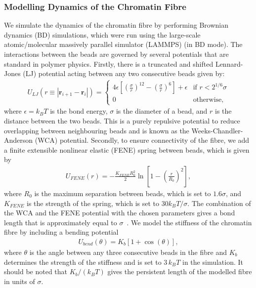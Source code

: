 \documentclass[12pt]{article}
\begin{document}
\subsubsection{Modelling Dynamics of the Chromatin Fibre}
We simulate the dynamics of the chromatin fibre by performing Brownian dynamics (BD) simulations, which were run using the large-scale atomic/molecular massively parallel simulator (LAMMPS) (in BD mode). The interactions between the beads are governed by several potentials that are standard in polymer physics. Firstly, there is a truncated and shifted Lennard-Jones (LJ) potential acting between any two consecutive beads given by:
\begin{eqnarray}
U_{LJ}(r \equiv |\bm{r}_{i+1} - \bm{r}_i|) = \left\{ 
	\begin{array}{ll}
		4\epsilon \left[\left(\frac{\sigma}{r}\right)^{12} - \left(\frac{\sigma}{r}\right)^6\right] + \epsilon & \textrm{if $r < 2^{1/6}\sigma$}\\
		0 & \textrm{otherwise},
	\end{array}
\right.
\end{eqnarray}
where $\epsilon = k_BT$ is the bond energy, $\sigma$ is the diameter of a bead, and $r$ is the distance between the two beads. This is a purely repulsive potential to reduce overlapping between neighbouring beads and is known as the Weeks-Chandler-Anderson (WCA) potential. Secondly, to ensure connectivity of the fibre, we add a finite extensible nonlinear elastic (FENE) spring between beads, which is given by
\begin{eqnarray}
U_{FENE}(r) = - \frac{K_{FENE}R_0^2}{2}\ln\left[1-\left(\frac{r}{R_0}\right)^2\right],
\end{eqnarray}
where $R_0$ is the maximum separation between beads, which is set to $1.6\sigma$, and $K_{FENE}$ is the strength of the spring, which is set to $30k_BT/\sigma$. The combination of the WCA and the FENE potential with the chosen parameters gives a bond length that is approximately equal to $ \sigma$~\cite{brackley2013}. We model the stiffness of the chromatin fibre by including a bending potential~\cite{kremer1990}
\begin{eqnarray}
U_{bend}(\theta) = K_b \left[1 + \cos(\theta)\right],
\end{eqnarray}
where $\theta$ is the angle between any three consecutive beads in the fibre and $K_b$ determines the strength of the stiffness and is set to $3\,k_BT$ in the simulation. It should be noted that $K_b/(k_BT)$ gives the persistent length of the modelled fibre in units of $\sigma$. 
\end{document}
